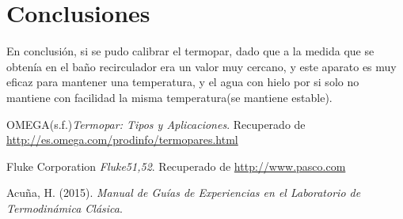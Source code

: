 \documentclass[12pt]{article}
\begin{document}
\section{Conclusiones}
En conclusión, si se pudo calibrar el termopar, dado que a la medida que se obtenía en el baño recirculador era un valor muy cercano, y este aparato es muy eficaz para mantener una temperatura, y el agua con hielo por si solo no mantiene con facilidad la misma temperatura(se mantiene estable).

\pagebreak


\begin{thebibliography}{6}
OMEGA(s.f.)\textit{Termopar: Tipos y Aplicaciones}. Recuperado de \url{http://es.omega.com/prodinfo/termopares.html}
	
	Fluke Corporation \textit{Fluke51,52}. Recuperado de   \url{http://www.pasco.com}

Acu\~na, H. (2015). \textit{Manual de Guías de Experiencias en el Laboratorio de Termodinámica Clásica}.

\end{thebibliography}
\end{document}
